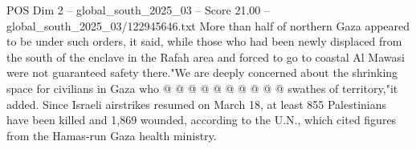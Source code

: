 \begin{textsample}{POS Dim 2 – global\_south\_2025\_03 – Score 21.00 – global\_south\_2025\_03/122945646.txt}
More than half of northern Gaza appeared to be under such orders, it said, while those who had been newly displaced from the south of the enclave in the Rafah area and forced to go to coastal Al Mawasi were not guaranteed safety there."We are deeply concerned about the shrinking space for civilians in Gaza who @ @ @ @ @ @ @ @ @ @ swathes of territory,"it added.
Since Israeli airstrikes resumed on March 18, at least 855 Palestinians have been killed and 1,869 wounded, according to the U.N., which cited figures from the Hamas-run Gaza health ministry.

\end{textsample}
